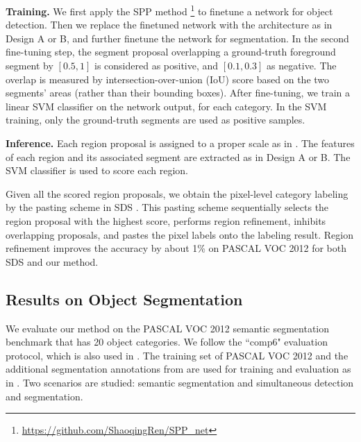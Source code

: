 \documentclass[10pt,twocolumn,letterpaper]{article}
\begin{document}
\vspace{6pt}
\noindent \textbf{Training.} We first apply the SPP method \cite{he2014spatial}\footnote{\url{https://github.com/ShaoqingRen/SPP_net}} to finetune a network for object detection. Then we replace the finetuned network with the architecture as in Design A or B, and further finetune the network for segmentation. In the second fine-tuning step, the segment proposal overlapping a ground-truth foreground segment by $[0.5,1]$ is considered as positive, and $[0.1,0.3]$ as negative. The overlap is measured by intersection-over-union (IoU) score based on the two segments' areas (rather than their bounding boxes).
After fine-tuning, we train a linear SVM classifier on the network output, for each category. In the SVM training, only the ground-truth segments are used as positive samples.

\vspace{6pt}
\noindent \textbf{Inference.}  Each region proposal is assigned to a proper scale as in \cite{he2014spatial}. The features of each region and its associated segment are extracted as in Design A or B. The SVM classifier is used to score each region.

Given all the scored region proposals, we obtain the pixel-level category labeling by the pasting scheme in SDS \cite{hariharan2014simultaneous}. This pasting scheme sequentially selects the region proposal with the highest score, performs region refinement, inhibits overlapping proposals, and pastes the pixel labels onto the labeling result. Region refinement improves the accuracy by about 1\% on PASCAL VOC 2012 for both SDS and our method.

\subsection{Results on Object Segmentation}
\label{sec:exp1}

We evaluate our method on the PASCAL VOC 2012 semantic segmentation benchmark \cite{everingham2010pascal} that has 20 object categories. We follow the ``comp6" evaluation protocol, which is also used in \cite{carreira2012semantic,girshick2013rich,hariharan2014simultaneous}. The training set of PASCAL VOC 2012 and the additional segmentation annotations from \cite{hariharan2011semantic} are used for training and evaluation as in \cite{carreira2012semantic,girshick2013rich,hariharan2014simultaneous}. Two scenarios are studied: semantic segmentation and simultaneous detection and segmentation.
\end{document}
